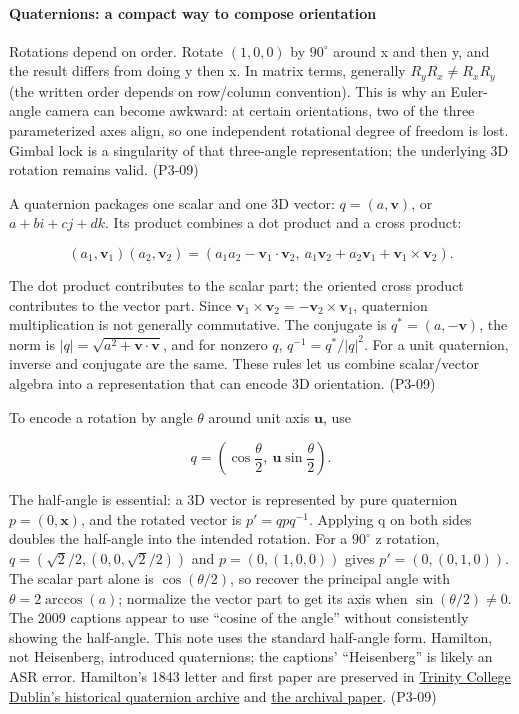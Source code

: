 \paragraph{Quaternions: a compact way to compose orientation}\label{quaternions-a-compact-way-to-compose-orientation}

Rotations depend on order. Rotate \((1,0,0)\) by \(90^\circ\) around x and then y, and the result differs from doing y then x. In matrix terms, generally \(R_yR_x\ne R_xR_y\) (the written order depends on row/column convention). This is why an Euler-angle camera can become awkward: at certain orientations, two of the three parameterized axes align, so one independent rotational degree of freedom is lost. Gimbal lock is a singularity of that three-angle representation; the underlying 3D rotation remains valid. (P3-09)

A quaternion packages one scalar and one 3D vector: \(q=(a,\mathbf v)\), or \(a+bi+cj+dk\). Its product combines a dot product and a cross product:

\[
(a_1,\mathbf v_1)(a_2,\mathbf v_2)=
(a_1a_2-\mathbf v_1\cdot\mathbf v_2,\ a_1\mathbf v_2+a_2\mathbf v_1+\mathbf v_1\times\mathbf v_2).
\]

The dot product contributes to the scalar part; the oriented cross product contributes to the vector part. Since \(\mathbf v_1\times\mathbf v_2=-\mathbf v_2\times\mathbf v_1\), quaternion multiplication is not generally commutative. The conjugate is \(q^*=(a,-\mathbf v)\), the norm is \(|q|=\sqrt{a^2+\mathbf v\cdot\mathbf v}\), and for nonzero \(q\), \(q^{-1}=q^*/|q|^2\). For a unit quaternion, inverse and conjugate are the same. These rules let us combine scalar/vector algebra into a representation that can encode 3D orientation. (P3-09)

To encode a rotation by angle \(\theta\) around unit axis \(\mathbf u\), use

\[
q=\left(\cos\frac{\theta}{2},\ \mathbf u\sin\frac{\theta}{2}\right).
\]

The half-angle is essential: a 3D vector is represented by pure quaternion \(p=(0,\mathbf x)\), and the rotated vector is \(p'=q p q^{-1}\). Applying q on both sides doubles the half-angle into the intended rotation. For a \(90^\circ\) z rotation, \(q=(\sqrt2/2,(0,0,\sqrt2/2))\) and \(p=(0,(1,0,0))\) gives \(p'=(0,(0,1,0))\). The scalar part alone is \(\cos(\theta/2)\), so recover the principal angle with \(\theta=2\arccos(a)\); normalize the vector part to get its axis when \(\sin(\theta/2)\ne0\). The 2009 captions appear to use ``cosine of the angle'' without consistently showing the half-angle. This note uses the standard half-angle form. Hamilton, not Heisenberg, introduced quaternions; the captions' ``Heisenberg'' is likely an ASR error. Hamilton's 1843 letter and first paper are preserved in \href{https://www.maths.tcd.ie/pub/HistMath/People/Hamilton/QLetter/}{Trinity College Dublin's historical quaternion archive} and \href{https://www.maths.tcd.ie/pub/HistMath/People/Hamilton/Quatern1/}{the archival paper}. (P3-09)

